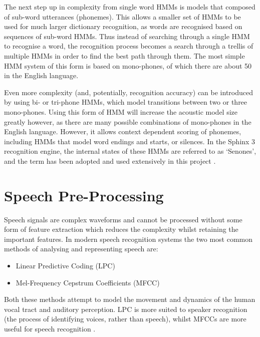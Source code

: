 		The next step up in complexity from single word HMMs is models that composed of sub-word utterances (phonemes).  This allows a smaller set of HMMs to be used for much larger dictionary recognition, as words are recognised based on sequences of sub-word HMMs.  Thus instead of searching through a single HMM to recognise a word, the recognition process becomes a search through a trellis of multiple HMMs in order to find the best path through them.  The most simple HMM system of this form is based on mono-phones, of which there are about 50 in the English language.

		Even more complexity (and, potentially, recognition accuracy) can be introduced by using bi- or tri-phone HMMs, which model transitions between two or three mono-phones.  Using this form of HMM will increase the acoustic model size greatly however, as there are many possible combinations of mono-phones in the English language.  However, it allows context dependent scoring of phonemes, including HMMs that model word endings and starts, or silences.  In the Sphinx 3 recognition engine, the internal states of these HMMs are referred to as `Senones', and the term has been adopted and used extensively in this project \cite{sphinx}.



\section{Speech Pre-Processing} %
\label{sec:speech_pre_processing}
	Speech signals are complex waveforms and cannot be processed without some form of feature extraction which reduces the complexity whilst retaining the important features.  In modern speech recognition systems the two most common methods of analysing and representing speech are: \cite{gaikwad2010review}
	\begin{itemize}
		\item Linear Predictive Coding (LPC)
		\item Mel-Frequency Cepstrum Coefficients (MFCC)
	\end{itemize}
	Both these methods attempt to model the movement and dynamics of the human vocal tract and auditory perception.  LPC is more suited to speaker recognition (the process of identifying voices, rather than speech), whilst MFCCs are more useful for speech recognition \cite{sd2012interview}.

